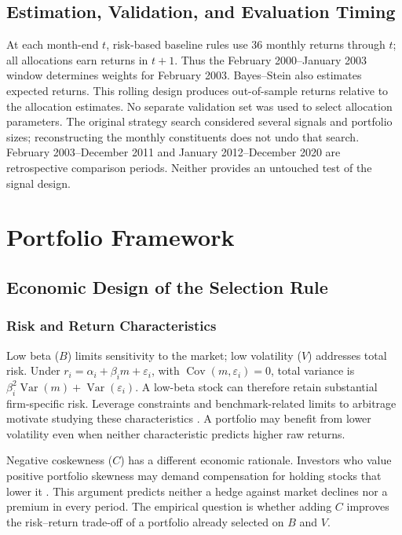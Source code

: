 \documentclass[letterpaper,journal]{IEEEtran}
\begin{document}
\subsection{Estimation, Validation, and Evaluation Timing}
At each month-end $t$, risk-based baseline rules use 36 monthly returns through $t$; all allocations earn returns in $t+1$. Thus the February 2000--January 2003 window determines weights for February 2003. Bayes--Stein also estimates expected returns. This rolling design produces out-of-sample returns relative to the allocation estimates. No separate validation set was used to select allocation parameters. The original strategy search considered several signals and portfolio sizes; reconstructing the monthly constituents does not undo that search. February 2003--December 2011 and January 2012--December 2020 are retrospective comparison periods. Neither provides an untouched test of the signal design.

\section{Portfolio Framework}\label{sec:framework}
\subsection{Economic Design of the Selection Rule}
\subsubsection{Risk and Return Characteristics}
Low beta ($B$) limits sensitivity to the market; low volatility ($V$) addresses total risk. Under $r_i=\alpha_i+\beta_i m+\varepsilon_i$, with $\operatorname{Cov}(m,\varepsilon_i)=0$, total variance is $\beta_i^2\operatorname{Var}(m)+\operatorname{Var}(\varepsilon_i)$. A low-beta stock can therefore retain substantial firm-specific risk. Leverage constraints and benchmark-related limits to arbitrage motivate studying these characteristics \cite{bab,baker}. A portfolio may benefit from lower volatility even when neither characteristic predicts higher raw returns.

Negative coskewness ($C$) has a different economic rationale. Investors who value positive portfolio skewness may demand compensation for holding stocks that lower it \cite{coskew}. This argument predicts neither a hedge against market declines nor a premium in every period. The empirical question is whether adding $C$ improves the risk--return trade-off of a portfolio already selected on $B$ and $V$.
\end{document}
